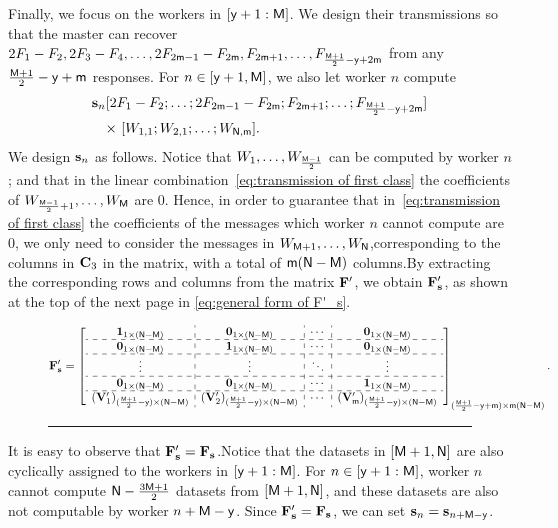 \documentclass[conference,letterpaper]{IEEEtran}
\begin{document}
Finally, we focus on the workers in $[{\sf y}+1 : {\sf M}]$. We design their transmissions so that the master can recover $2F_1 - F_2, 2F_3 - F_4, \ldots, 2F_{2{\sf m}-1} - F_{2{\sf m}}, F_{2{\sf m}+1}, \ldots, F_{\frac{{\sf M}+1}{2} - {\sf y} + 2{\sf m}}$ from any $\frac{{\sf M}+1}{2} - {\sf y} + {\sf m}$ responses.
 For $n \in [{\sf y}+1, {\sf M}]$, we also let worker $n$ compute
\begin{align}
{\bf s}_n & [ 2F_1 - F_2; \ldots; 2F_{2{\sf m}-1} - F_{2{\sf m}}; F_{2{\sf m}+1}; \ldots; F_{\frac{{\sf M}+1}{2} - {\sf y} + 2{\sf m}} ]  \nonumber \\
& \text{× }[ W_{1,1}; W_{2,1}; \ldots; W_{{\sf N},{\sf m}} ].
\label{eq:transmission of first class}
\end{align}
     We design ${\bf s}_{n} $ as follows.
Notice that $W_1,\ldots,W_{\frac{{\sf M}-1}{2}}$ can be computed by worker $n$; and that in the linear combination~\eqref{eq:transmission of first class} the coefficients of   $W_{\frac{{\sf M}-1}{2}+1}, \ldots, W_{{\sf M}}$ are $0$. 
Hence, in order to guarantee that in~\eqref{eq:transmission of first class} the coefficients of the messages which worker $n$ cannot compute are $0$, we only need to consider the messages in $W_{{\sf M}+1}, \ldots, W_{{\sf N}}$,corresponding to the columns in ${\bf C}_3$ in the matrix, with a total of ${\sf m} ({\sf N} - {\sf M})$ columns.By extracting the corresponding rows and columns from the matrix \( {\bf F}' \), we obtain \( {\bf F}'_{\bf s} \), as shown at the top of the next page in \eqref{eq:general form of F'_s}.
\begin{figure}
\begin{equation}
 {\bf F}'_{\bf s} = 
\left[
\begin{array}{c:c:c:c}
{\bf 1}_{1 \times (\Nsf-\Msf)}  & {\bf 0}_{1 \times (\Nsf-\Msf)}  & \cdots & {\bf 0}_{1 \times (\Nsf-\Msf)}   \\ \hdashline
{\bf 0}_{1 \times (\Nsf-\Msf)} &  {\bf 1}_{1 \times (\Nsf-\Msf)}   & \cdots & {\bf 0}_{1 \times (\Nsf-\Msf)}   \\ \hdashline 
 \vdots   & \vdots  &  \ddots & \vdots \\ \hdashline
 {\bf 0}_{1 \times (\Nsf-\Msf)} &   {\bf 0}_{1 \times (\Nsf-\Msf)}    & \cdots &  {\bf 1}_{1 \times (\Nsf-\Msf)} \\ \hdashline
 ({\bf V}'_{1})_{ (\frac{\Msf + 1}{2} - \ysf) \times (\Nsf-\Msf)}  &  ({\bf V}'_{2})_{ (\frac{\Msf + 1}{2} - \ysf) \times (\Nsf-\Msf)}  &   \cdots   &   ({\bf V}'_{\msf})_{ (\frac{\Msf + 1}{2} - \ysf) \times (\Nsf-\Msf)} 
 \end{array}
\right]_{(\frac{\Msf + 1}{2} - \ysf + \msf) \times \msf(\Nsf-\Msf)}.
\label{eq:general form of F'_s}
\end{equation}
\rule{\textwidth}{0.2pt} %
\end{figure}
It is easy to observe that ${\bf F}'_{\bf s} = {\bf F}_{\bf s}$.Notice that the datasets in $[{\sf M}+1, {\sf N}]$ are also cyclically assigned to the workers in $[{\sf y}+1 : {\sf M}]$. For $n \in [{\sf y}+1 : {\sf M}]$, worker $n$ cannot compute ${{\sf N} - \frac{3{\sf M} + 1}{2}}$ datasets from $[{\sf M}+1, {\sf N}]$, and these datasets are also not computable by worker $n + {\sf M} - {\sf y}$. Since ${\bf F}'_{\bf s} = {\bf F}_{\bf s}$, we can  set ${\bf s}_n = {\bf s}_{n + {\sf M} - {\sf y}}$.
\end{document}
